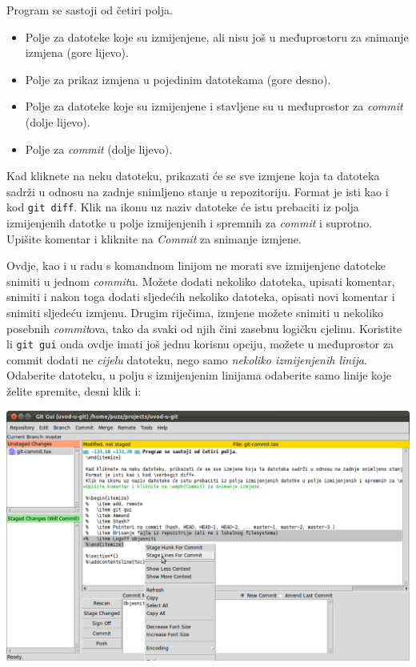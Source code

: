 Program se sastoji od četiri polja. 

\begin{itemize}
	\item Polje za datoteke koje su izmijenjene, ali nisu još u međuprostoru za snimanje izmjena (gore lijevo).
	\item Polje za prikaz izmjena u pojedinim datotekama (gore desno). 
	\item Polje za datoteke koje su izmijenjene i stavljene su u međuprostor za \emph{commit} (dolje lijevo).
	\item Polje za \emph{commit} (dolje lijevo).
\end{itemize}

Kad kliknete na neku datoteku, prikazati će se sve izmjene koja ta datoteka sadrži u odnosu na zadnje snimljeno stanje u repozitoriju.
Format je isti kao i kod \verb+git diff+.
Klik na ikonu uz naziv datoteke će istu prebaciti iz polja izmijenjenih datotke u polje izmijenjenih i spremnih za \emph{commit} i suprotno.
Upišite komentar i kliknite na \emph{Commit} za snimanje izmjene.

Ovdje, kao i u radu s komandnom linijom ne morati sve izmijenjene datoteke snimiti u jednom \emph{commit}u. 
Možete dodati nekoliko datoteka, upisati komentar, snimiti i nakon toga dodati sljedećih nekoliko datoteka, opisati novi komentar i snimiti sljedeću izmjenu.
Drugim riječima, izmjene možete snimiti u nekoliko posebnih \emph{commit}ova, tako da svaki od njih čini zasebnu logičku cjelinu.
Koristite li \verb+git gui+ onda ovdje imati još jednu korisnu opciju, možete u međuprostor za commit dodati ne \emph{cijelu} datoteku, nego samo \emph{nekoliko izmijenjenih linija}.
Odaberite datoteku, u polju s izmijenjenim linijama odaberite samo linije koje želite spremite, desni klik i:

\includegraphics[width=14cm]{images/git-gui-stage-lines-to-commit.png}

